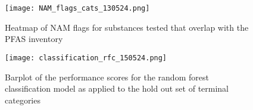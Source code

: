 \documentclass[
  super,
  preprint,
  3p]{elsarticle}
\begin{document}
\begin{figure}

{\centering \texttt{[image: NAM\_flags\_cats\_130524.png]}

}

\caption{\label{fig-nams-hm}Heatmap of NAM flags for substances tested
that overlap with the PFAS inventory}

\end{figure}

\begin{figure}

{\centering \texttt{[image: classification\_rfc\_150524.png]}

}

\caption{\label{fig-rfc}Barplot of the performance scores for the random
forest classification model as applied to the hold out set of terminal
categories}

\end{figure}
\end{document}
